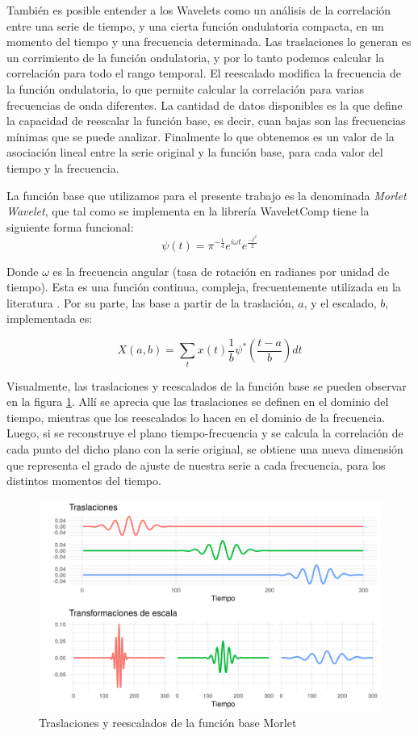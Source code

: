 \documentclass[a4paper]{article}
\begin{document}
También es posible entender a los Wavelets como un análisis de la correlación entre una serie de tiempo, y una cierta función ondulatoria compacta, en un momento del tiempo y una frecuencia determinada. Las traslaciones lo generan es un corrimiento de la función ondulatoria, y por lo tanto podemos calcular la correlación para todo el rango temporal. El reescalado modifica la frecuencia de la función ondulatoria, lo que permite calcular la correlación para varias frecuencias de onda diferentes. La cantidad de datos disponibles es la que define la capacidad de reescalar la función base, es decir, cuan bajas son las frecuencias mínimas que se puede analizar. Finalmente lo que obtenemos es un valor de la asociación lineal entre la serie original y la función base, para cada valor del tiempo y la frecuencia.  

La función base que utilizamos para el presente trabajo es la denominada \textit{Morlet Wavelet}, que tal como se implementa en la librería WaveletComp \citep{Roesch2018} tiene la siguiente forma funcional:
$$
\psi(t)=\pi^{-\frac{1}{4}}e^{i\omega t}e^{\frac{-t^2}{2}}
$$

Donde $\omega$ es la frecuencia angular (tasa de rotación en radianes por unidad de tiempo). Esta es una función continua, compleja, frecuentemente utilizada en la literatura \citep{conraria2011continuous}. Por su parte, las base a partir de la traslación, $a$, y el escalado, $b$, implementada es:

$$
X(a,b)=\sum_{t} x(t)   \frac{1}{b} \psi^*\left(\frac{t-a}{b}\right)dt
$$

Visualmente, las traslaciones y reescalados de la función base se pueden observar en la figura \ref{fig:morlet}. Allí se aprecia que las traslaciones se definen en el dominio del tiempo, mientras que los reescalados lo hacen en el dominio de la frecuencia. Luego, si se reconstruye el plano tiempo-frecuencia y se calcula la correlación de cada punto del dicho plano con la serie original, se obtiene una nueva dimensión que representa el grado de ajuste de nuestra serie a cada frecuencia, para los distintos momentos del tiempo. 

\begin{figure}[H]
	\centering
	\includegraphics[width=\linewidth]{morelt.png}
	\caption{Traslaciones y reescalados de la función base Morlet} \label{fig:morlet}
\end{figure}
\end{document}
